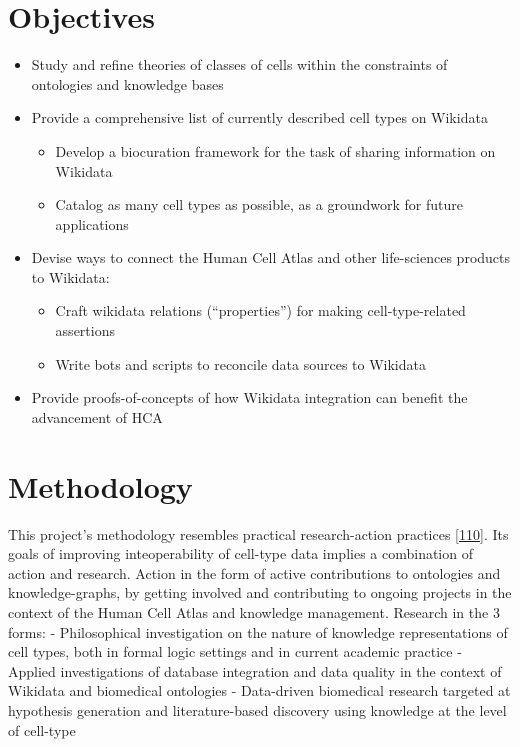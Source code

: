 \hypertarget{objectives}{%
\section{Objectives}\label{objectives}}

\begin{itemize}
\item
  Study and refine theories of classes of cells within the constraints of ontologies and knowledge bases
\item
  Provide a comprehensive list of currently described cell types on Wikidata

  \begin{itemize}
  \tightlist
  \item
    Develop a biocuration framework for the task of sharing information on Wikidata
  \item
    Catalog as many cell types as possible, as a groundwork for future applications
  \end{itemize}
\item
  Devise ways to connect the Human Cell Atlas and other life-sciences products to Wikidata:

  \begin{itemize}
  \tightlist
  \item
    Craft wikidata relations (``properties'') for making cell-type-related assertions
  \item
    Write bots and scripts to reconcile data sources to Wikidata
  \end{itemize}
\item
  Provide proofs-of-concepts of how Wikidata integration can benefit the advancement of HCA
\end{itemize}

\hypertarget{methodology}{%
\section{Methodology}\label{methodology}}

This project's methodology resembles practical research-action practices {[}\protect\hyperlink{ref-11UV98PHT}{110}{]}. Its goals of improving inteoperability of cell-type data implies a combination of action and research. Action in the form of active contributions to ontologies and knowledge-graphs, by getting involved and contributing to ongoing projects in the context of the Human Cell Atlas and knowledge management. Research in the 3 forms:
- Philosophical investigation on the nature of knowledge representations of cell types, both in formal logic settings and in current academic practice
- Applied investigations of database integration and data quality in the context of Wikidata and biomedical ontologies
- Data-driven biomedical research targeted at hypothesis generation and literature-based discovery using knowledge at the level of cell-type


